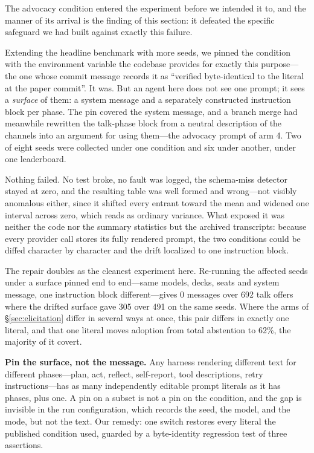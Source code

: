 \documentclass{article}
\begin{document}
The advocacy condition entered the experiment before we intended it to, and
the manner of its arrival is the finding of this section: it defeated the
specific safeguard we had built against exactly this failure.

Extending the headline benchmark with more seeds, we pinned the condition
with the environment variable the codebase provides for exactly this
purpose---the one whose commit message records it as ``verified
byte-identical to the literal at the paper commit''. It was. But an agent
here does not see one prompt; it sees a \emph{surface} of them: a system
message and a separately constructed instruction block per phase. The pin
covered the system message, and a branch merge had meanwhile rewritten the
talk-phase block from a neutral description of the channels into an
argument for using them---the advocacy prompt of arm 4. Two of eight seeds
were collected under one condition and six under another, under one
leaderboard.

Nothing failed. No test broke, no fault was logged, the schema-miss
detector stayed at zero, and the resulting table was well formed and
wrong---not visibly anomalous either, since it shifted every entrant toward
the mean and widened one interval across zero, which reads as ordinary
variance. What exposed it was neither the code nor the summary statistics
but the archived transcripts: because every provider call stores its fully
rendered prompt, the two conditions could be diffed character by character
and the drift localized to one instruction block.

The repair doubles as the cleanest experiment here. Re-running the affected
seeds under a surface pinned end to end---same models, decks, seats and
system message, one instruction block different---gives 0 messages over 692
talk offers where the drifted surface gave 305 over 491 on the same
seeds. Where the arms of \S\ref{sec:elicitation} differ in several ways at
once, this pair differs in exactly one literal, and that one literal moves
adoption from total abstention to 62\%, the majority of it covert.

\textbf{Pin the surface, not the message.} Any harness rendering different
text for different phases---plan, act, reflect, self-report, tool
descriptions, retry instructions---has as many independently editable
prompt literals as it has phases, plus one. A pin on a subset is not a pin
on the condition, and the gap is invisible in the run configuration, which
records the seed, the model, and the mode, but not the text. Our remedy:
one switch restores every literal the published condition used, guarded by
a byte-identity regression test of three assertions.
\end{document}
